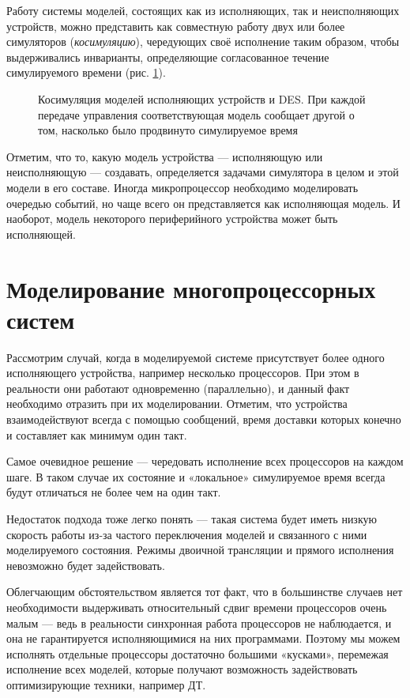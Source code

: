 Работу системы моделей, состоящих как из исполняющих, так и неисполняющих устройств, можно представить как совместную работу двух или более симуляторов (\textit{косимуляцию}), чередующих своё исполнение таким образом, чтобы выдерживались инварианты, определяющие согласованное течение симулируемого времени (рис. \ref{fig:cosim}).

\begin{figure}[htb]
    \centering
    \caption[Косимуляция моделей исполняющих устройств и DES]{Косимуляция моделей исполняющих устройств и DES. При каждой передаче управления соответствующая модель сообщает другой о том, насколько было продвинуто симулируемое время}
    \label{fig:cosim}
\end{figure}

Отметим, что то, какую модель устройства — исполняющую или неисполняющую — создавать, определяется задачами симулятора в целом и этой модели в его составе. Иногда микропроцессор необходимо моделировать очередью событий, но чаще всего он представляется как исполняющая модель. И наоборот, модель некоторого периферийного устройства может быть исполняющей.

\section{Моделирование многопроцессорных систем}\label{sec:mp-simulation}

Рассмотрим случай, когда в моделируемой системе присутствует более одного исполняющего устройства, например несколько процессоров. При этом в реальности они работают одновременно (параллельно), и данный факт необходимо отразить при их моделировании. Отметим, что устройства взаимодействуют всегда с помощью сообщений, время доставки которых конечно и составляет как минимум один такт.

Самое очевидное решение — чередовать исполнение всех процессоров на каждом  шаге. В таком случае их состояние и «локальное» симулируемое время всегда будут отличаться не более чем на один такт.

Недостаток подхода тоже легко понять — такая система будет иметь низкую скорость работы из-за частого переключения моделей и связанного с ними моделируемого состояния. Режимы двоичной трансляции и прямого исполнения невозможно будет задействовать.

Облегчающим обстоятельством является тот факт, что в большинстве случаев нет необходимости выдерживать относительный сдвиг времени процессоров очень малым — ведь в реальности синхронная работа процессоров не наблюдается, и она не гарантируется исполняющимися на них программами. Поэтому мы можем исполнять отдельные процессоры достаточно большими «кусками», перемежая исполнение всех моделей, которые получают возможность задействовать оптимизирующие техники, например ДТ.

